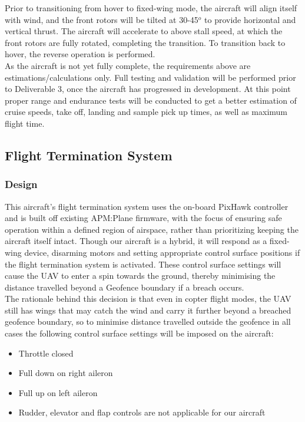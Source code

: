 Prior to transitioning from hover to fixed-wing mode, the aircraft will align itself with wind, and the front rotors will be tilted at 30-45$^o$ to provide horizontal and vertical thrust. The aircraft will accelerate to above stall speed, at which the front rotors are fully rotated, completing the transition. To transition back to hover, the reverse operation is performed.\\

As the aircraft is not yet fully complete, the requirements above are estimations/calculations only. Full testing and validation will be performed prior to Deliverable 3, once the aircraft has progressed in development. At this point proper range and endurance tests will be conducted to get a better estimation of cruise speeds, take off, landing and sample pick up times, as well as maximum flight time.

\subsection{Flight Termination System}
\subsubsection{Design}
This aircraft's flight termination system uses the on-board PixHawk controller and is built off existing APM:Plane firmware, with the focus of ensuring safe operation within a defined region of airspace, rather than prioritizing keeping the aircraft itself intact. Though our aircraft is a hybrid, it will respond as a fixed-wing device, disarming motors and setting appropriate control surface positions if the flight termination system is activated. These control surface settings will cause the UAV to enter a spin towards the ground, thereby minimising the distance travelled beyond a Geofence boundary if a breach occurs.\\

The rationale behind this decision is that even in copter flight modes, the UAV still has wings that may catch the wind and carry it further beyond a breached geofence boundary, so to minimise distance travelled outside the geofence in all cases the following control surface settings will be imposed on the aircraft:
\begin{itemize}
	\item Throttle closed
	\item Full down on right aileron
	\item Full up on left aileron
	\item Rudder, elevator and flap controls are not applicable for our aircraft
\end{itemize}

